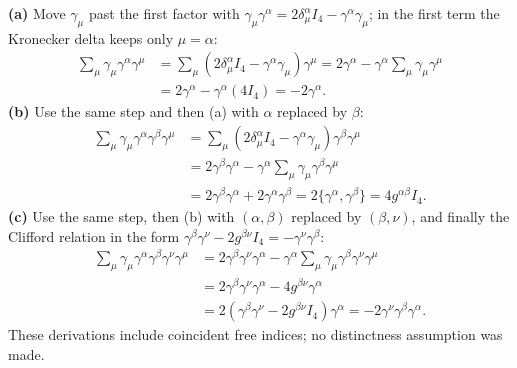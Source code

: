 \textbf{(a)} Move $\gamma_\mu$ past the first factor with
$\gamma_\mu\gamma^\alpha=2\delta_\mu^\alpha I_4-\gamma^\alpha\gamma_\mu$;
in the first term the Kronecker delta keeps only $\mu=\alpha$:
\[
\begin{aligned}
\sum_\mu\gamma_\mu\gamma^\alpha\gamma^\mu
&=\sum_\mu(2\delta_\mu^\alpha I_4-\gamma^\alpha\gamma_\mu)\gamma^\mu
=2\gamma^\alpha-\gamma^\alpha\sum_\mu\gamma_\mu\gamma^\mu\\
&=2\gamma^\alpha-\gamma^\alpha(4I_4)
=\boxed{-2\gamma^\alpha}.
\end{aligned}
\]
\textbf{(b)} Use the same step and then (a) with $\alpha$ replaced
by $\beta$:
\[
\begin{aligned}
\sum_\mu\gamma_\mu\gamma^\alpha\gamma^\beta\gamma^\mu
&=\sum_\mu(2\delta_\mu^\alpha I_4-\gamma^\alpha\gamma_\mu)
\gamma^\beta\gamma^\mu\\
&=2\gamma^\beta\gamma^\alpha
-\gamma^\alpha\sum_\mu\gamma_\mu\gamma^\beta\gamma^\mu\\
&=2\gamma^\beta\gamma^\alpha+2\gamma^\alpha\gamma^\beta
=2\{\gamma^\alpha,\gamma^\beta\}
=\boxed{4g^{\alpha\beta}I_4}.
\end{aligned}
\]
\textbf{(c)} Use the same step, then (b) with $(\alpha,\beta)$
replaced by $(\beta,\nu)$, and finally the Clifford relation in the
form $\gamma^\beta\gamma^\nu-2g^{\beta\nu}I_4=-\gamma^\nu\gamma^\beta$:
\[
\begin{aligned}
\sum_\mu\gamma_\mu\gamma^\alpha\gamma^\beta\gamma^\nu\gamma^\mu
&=2\gamma^\beta\gamma^\nu\gamma^\alpha
-\gamma^\alpha\sum_\mu\gamma_\mu\gamma^\beta\gamma^\nu\gamma^\mu\\
&=2\gamma^\beta\gamma^\nu\gamma^\alpha-4g^{\beta\nu}\gamma^\alpha\\
&=2(\gamma^\beta\gamma^\nu-2g^{\beta\nu}I_4)\gamma^\alpha
=\boxed{-2\gamma^\nu\gamma^\beta\gamma^\alpha}.
\end{aligned}
\]
These derivations include coincident free indices; no distinctness
assumption was made.

